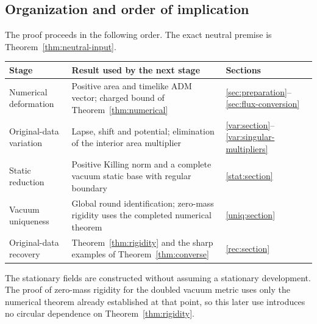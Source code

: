 \subsection{Organization and order of implication}

The proof proceeds in the following order. The exact neutral premise is Theorem~\ref{thm:neutral-input}.
\begin{center}
\small
\begin{tabular}{@{}p{.22\linewidth}p{.58\linewidth}p{.13\linewidth}@{}}
\toprule
Stage & Result used by the next stage & Sections\\
\midrule
Numerical deformation & Positive area and timelike ADM vector; charged bound of Theorem~\ref{thm:numerical} & \ref{sec:preparation}--\ref{sec:flux-conversion}\\[4pt]
Original-data variation & Lapse, shift and potential; elimination of the interior area multiplier & \ref{var:section}--\ref{var:singular-multipliers}\\[4pt]
Static reduction & Positive Killing norm and a complete vacuum static base with regular boundary & \ref{stat:section}\\[4pt]
Vacuum uniqueness & Global round identification; zero-mass rigidity uses the completed numerical theorem & \ref{uniq:section}\\[4pt]
Original-data recovery & Theorem~\ref{thm:rigidity} and the sharp examples of Theorem~\ref{thm:converse} & \ref{rec:section}\\
\bottomrule
\end{tabular}
\end{center}
The stationary fields are constructed without assuming a stationary development. The proof of zero-mass rigidity for the doubled vacuum metric uses only the numerical theorem already established at that point, so this later use introduces no circular dependence on Theorem~\ref{thm:rigidity}.
